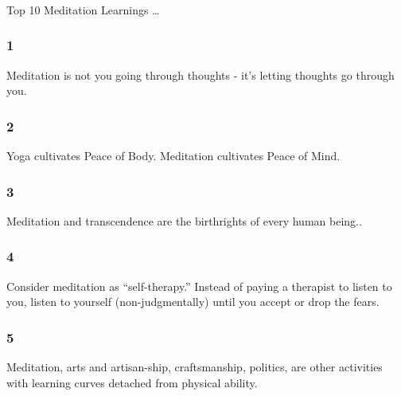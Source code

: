 \begin{frame}[fragile]\frametitle{}
\begin{center}
{\Large Top 10 Meditation Learnings \ldots }

\end{center}
\end{frame}

\begin{frame}[fragile]\frametitle{1}
\begin{center}
Meditation is not you going through thoughts - it’s letting thoughts go through you.
\end{center}
\end{frame}

\begin{frame}[fragile]\frametitle{2}
\begin{center}
Yoga cultivates Peace of Body. Meditation cultivates Peace of Mind.
\end{center}
\end{frame}

\begin{frame}[fragile]\frametitle{3}
\begin{center}
Meditation and transcendence are the birthrights of every human being..
\end{center}
\end{frame}

\begin{frame}[fragile]\frametitle{4}
\begin{center}
Consider meditation as “self-therapy.” Instead of paying a therapist to listen to you, listen to yourself (non-judgmentally) until you accept or drop the fears.
\end{center}
\end{frame}

\begin{frame}[fragile]\frametitle{5}
\begin{center}
Meditation, arts and artisan-ship, craftsmanship, politics, are other activities with learning curves detached from physical ability.
\end{center}
\end{frame}

